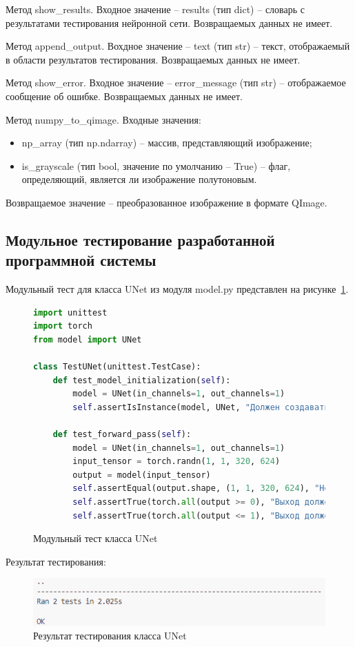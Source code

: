 Метод show\_results. Входное значение -- results (тип dict) -- словарь с результатами тестирования нейронной сети. Возвращаемых данных не имеет.

Метод append\_output. Вохдное значение -- text (тип str) -- текст, отображаемый в области результатов тестирования. Возвращаемых данных не имеет.

Метод show\_error. Входное значение -- error\_message (тип str) -- отображаемое сообщение об ошибке. Возвращаемых данных не имеет.

Метод numpy\_to\_qimage. Входные значения:
\begin{itemize}
	\item np\_array (тип np.ndarray) -- массив, представляющий изображение;
	\item is\_grayscale (тип bool, значение по умолчанию -- True) -- флаг, определяющий, является ли изображение полутоновым.
\end{itemize}
Возвращаемое значение -- преобразованное изображение в формате QImage.

\subsection{Модульное тестирование разработанной программной системы}

Модульный тест для класса UNet из модуля model.py представлен на рисунке~\ref{model_test:image}.

\begin{figure}[H]
\begin{lstlisting}[language=Python]
import unittest
import torch
from model import UNet

class TestUNet(unittest.TestCase):
	def test_model_initialization(self):
		model = UNet(in_channels=1, out_channels=1)
		self.assertIsInstance(model, UNet, "Должен создаваться экземпляр UNet")
	
	def test_forward_pass(self):
		model = UNet(in_channels=1, out_channels=1)
		input_tensor = torch.randn(1, 1, 320, 624)
		output = model(input_tensor)
		self.assertEqual(output.shape, (1, 1, 320, 624), "Некорректный размер вывода")
		self.assertTrue(torch.all(output >= 0), "Выход должен быть ≥ 0")
		self.assertTrue(torch.all(output <= 1), "Выход должен быть ≤ 1")
\end{lstlisting}  
\caption{Модульный тест класса UNet}
\label{model_test:image}
\end{figure}

Результат тестирования:
\begin{figure}[H]
	\centering
	\includegraphics[width=0.7\linewidth]{images/model_test_results}
	\caption{Результат тестирования класса UNet}
	\label{fig:modeltestresults}
\end{figure}

